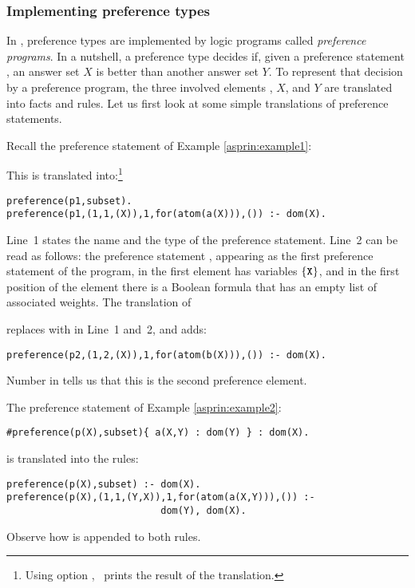 \subsubsection{Implementing preference types}

In \asprin, preference types are implemented by logic programs called \emph{preference programs}.
In a nutshell, a preference type decides if, 
given a preference statement , 
an answer set $X$ is better than another answer set $Y$.
To represent that decision by a preference program, 
the three involved elements , $X$, and $Y$ are translated into facts and rules.
Let us first look at some simple translations of preference statements.
\begin{example}
\label{asprin:example1translated}
Recall the preference statement  of Example \ref{asprin:example1}:

This is translated into:\footnote{%
Using option , \asprin\ prints the result of the translation.}
\begin{lstlisting}
preference(p1,subset).
preference(p1,(1,1,(X)),1,for(atom(a(X))),()) :- dom(X).
\end{lstlisting}
Line~1 states the name and the type of the preference statement.
Line~2 can be read as follows:
the preference statement ,
appearing as the first preference statement of the program,
in the first element has variables $\{\texttt{X}\}$,
and in the first position of the element there is a Boolean formula  that has an empty list of associated weights.
The translation of 

replaces  with  in Line~1 and~2, and adds:
\begin{lstlisting}[numbers=none]
preference(p2,(1,2,(X)),1,for(atom(b(X))),()) :- dom(X).
\end{lstlisting}
Number  in  tells us that this is the second preference element. 
\end{example}

\begin{example}
The preference statement of Example \ref{asprin:example2}: 
\begin{lstlisting}[numbers=none]
#preference(p(X),subset){ a(X,Y) : dom(Y) } : dom(X).
\end{lstlisting}
is translated into the rules:
\begin{lstlisting}[numbers=none]
preference(p(X),subset) :- dom(X).
preference(p(X),(1,1,(Y,X)),1,for(atom(a(X,Y))),()) :-
                           dom(Y), dom(X).
\end{lstlisting}
Observe how  is appended to both rules. 
\end{example}

